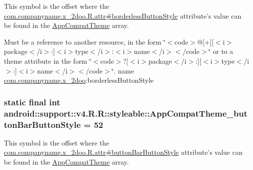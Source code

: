 This symbol is the offset where the \hyperlink{classcom_1_1companyname_1_1x__2doo_1_1_r_1_1attr_025794b28929d5f8d3f3dfdcf729474b}{com.companyname.x\_\-2doo.R.attr\#borderlessButtonStyle} attribute's value can be found in the \hyperlink{classandroid_1_1support_1_1v4_1_1_r_1_1styleable_0873e92ba21076bb5a4aeadeb7f5779f}{AppCompatTheme} array.

Must be a reference to another resource, in the form \char`\"{}$<$code$>$@\mbox{[}+\mbox{]}\mbox{[}$<$i$>$package$<$/i$>$:\mbox{]}$<$i$>$type$<$/i$>$:$<$i$>$name$<$/i$>$$<$/code$>$\char`\"{} or to a theme attribute in the form \char`\"{}$<$code$>$?\mbox{[}$<$i$>$package$<$/i$>$:\mbox{]}\mbox{[}$<$i$>$type$<$/i$>$:\mbox{]}$<$i$>$name$<$/i$>$$<$/code$>$\char`\"{}.  name \hyperlink{namespacecom_1_1companyname_1_1x__2doo}{com.companyname.x\_\-2doo}:borderlessButtonStyle \hypertarget{classandroid_1_1support_1_1v4_1_1_r_1_1styleable_5392994a38004dcbc49775cdd089d6e9}{
\subsubsection[{AppCompatTheme\_\-buttonBarButtonStyle}]{\setlength{\rightskip}{0pt plus 5cm}static final int android::support::v4.R.R::styleable::AppCompatTheme\_\-buttonBarButtonStyle = 52}}
\label{classandroid_1_1support_1_1v4_1_1_r_1_1styleable_5392994a38004dcbc49775cdd089d6e9}


This symbol is the offset where the \hyperlink{classcom_1_1companyname_1_1x__2doo_1_1_r_1_1attr_c2ebc2922f120882fc541367a64b8410}{com.companyname.x\_\-2doo.R.attr\#buttonBarButtonStyle} attribute's value can be found in the \hyperlink{classandroid_1_1support_1_1v4_1_1_r_1_1styleable_0873e92ba21076bb5a4aeadeb7f5779f}{AppCompatTheme} array.

